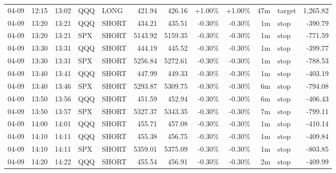 \documentclass[11pt,a4paper]{article}
\begin{document}
\begin{center}
\begin{longtable}{>{\color{txtmain}}l l l l l r r r r r >{\color{txtmain}}l r}
04-09 & 12:15 & 13:02 & QQQ & LONG & 421.94 & 426.16 & \textcolor{wingreen}{+1.00\%} & \textcolor{wingreen}{+1.00\%} & 47m & target & \textcolor{wingreen}{1,265.82} \\
04-09 & 13:20 & 13:21 & QQQ & SHORT & 434.21 & 435.51 & \textcolor{lossred}{-0.30\%} & \textcolor{lossred}{-0.30\%} & 1m & stop & \textcolor{lossred}{-390.79} \\
04-09 & 13:20 & 13:21 & SPX & SHORT & 5143.92 & 5159.35 & \textcolor{lossred}{-0.30\%} & \textcolor{lossred}{-0.30\%} & 1m & stop & \textcolor{lossred}{-771.59} \\
04-09 & 13:30 & 13:31 & QQQ & SHORT & 444.19 & 445.52 & \textcolor{lossred}{-0.30\%} & \textcolor{lossred}{-0.30\%} & 1m & stop & \textcolor{lossred}{-399.77} \\
04-09 & 13:30 & 13:31 & SPX & SHORT & 5256.84 & 5272.61 & \textcolor{lossred}{-0.30\%} & \textcolor{lossred}{-0.30\%} & 1m & stop & \textcolor{lossred}{-788.53} \\
04-09 & 13:40 & 13:41 & QQQ & SHORT & 447.99 & 449.33 & \textcolor{lossred}{-0.30\%} & \textcolor{lossred}{-0.30\%} & 1m & stop & \textcolor{lossred}{-403.19} \\
04-09 & 13:40 & 13:46 & SPX & SHORT & 5293.87 & 5309.75 & \textcolor{lossred}{-0.30\%} & \textcolor{lossred}{-0.30\%} & 6m & stop & \textcolor{lossred}{-794.08} \\
04-09 & 13:50 & 13:56 & QQQ & SHORT & 451.59 & 452.94 & \textcolor{lossred}{-0.30\%} & \textcolor{lossred}{-0.30\%} & 6m & stop & \textcolor{lossred}{-406.43} \\
04-09 & 13:50 & 13:57 & SPX & SHORT & 5327.37 & 5343.35 & \textcolor{lossred}{-0.30\%} & \textcolor{lossred}{-0.30\%} & 7m & stop & \textcolor{lossred}{-799.11} \\
04-09 & 14:00 & 14:01 & QQQ & SHORT & 455.71 & 457.08 & \textcolor{lossred}{-0.30\%} & \textcolor{lossred}{-0.30\%} & 1m & stop & \textcolor{lossred}{-410.14} \\
04-09 & 14:10 & 14:11 & QQQ & SHORT & 455.38 & 456.75 & \textcolor{lossred}{-0.30\%} & \textcolor{lossred}{-0.30\%} & 1m & stop & \textcolor{lossred}{-409.84} \\
04-09 & 14:10 & 14:11 & SPX & SHORT & 5359.01 & 5375.09 & \textcolor{lossred}{-0.30\%} & \textcolor{lossred}{-0.30\%} & 1m & stop & \textcolor{lossred}{-803.85} \\
04-09 & 14:20 & 14:22 & QQQ & SHORT & 455.54 & 456.91 & \textcolor{lossred}{-0.30\%} & \textcolor{lossred}{-0.30\%} & 2m & stop & \textcolor{lossred}{-409.99} \\

\end{longtable}
\end{center}
\end{document}
